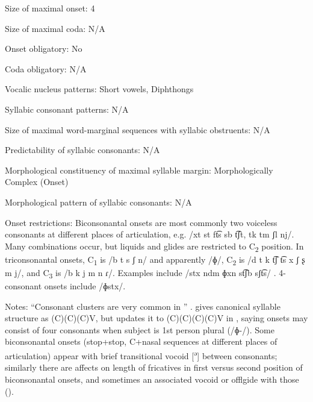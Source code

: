 {\begin{appendixdesc}
\item[Size of maximal onset:] 4

\item[Size of maximal coda:] N/A

\item[Onset obligatory:] No

\item[Coda obligatory:] N/A

\item[Vocalic nucleus patterns:] Short vowels, Diphthongs

\item[Syllabic consonant patterns:] N/A

\item[Size of maximal word-marginal sequences with syllabic obstruents:] N/A

\item[Predictability of syllabic consonants:] N/A

\item[Morphological constituency of maximal syllable margin:] Morphologically Complex (Onset)

\item[Morphological pattern of syllabic consonants:] N/A

\item[Onset restrictions:] Biconsonantal onsets are most commonly two voiceless consonants at different places of articulation, e.g. /xt st ft͡s sb t͡ʃt, tk tm ʃl nj/. Many combinations occur, but liquids and glides are restricted to C\textsubscript{2} position. In triconsonantal onsets, C\textsubscript{1} is /b t s ʃ n/ and apparently /ɸ/, C\textsubscript{2} is /d t k t͡ʃ t͡s x ʃ ʂ m j/, and C\textsubscript{3} is /b k j m n ɾ/. Examples include /stx ndm ɸxn st͡ʃb sʃt͡s/ . 4-consonant onsets include /ɸstx/.

\item[Notes:] “Consonant clusters are very common in ” \citep[81]{Howard1967}. \citet{Howard1967} gives canonical syllable structure as (C)(C)(C)V, but updates it to (C)(C)(C)(C)V in \citet{Howard1972}, saying onsets may consist of four consonants when subject is 1st person plural (/ɸ{}-/). Some biconsonantal onsets (stop+stop, C+nasal sequences at different places of articulation) appear with brief transitional vocoid [\textsuperscript{ə}] between consonants; similarly there are affects on length of fricatives in first versus second position of biconsonantal onsets, and sometimes an associated vocoid or offlgide with those (\citeyear[82]{Howard1967}).
\end{appendixdesc}
}
